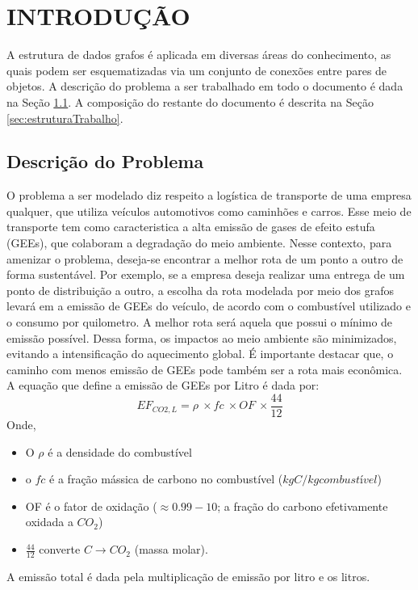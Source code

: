 \documentclass[
12pt,
a4paper,
semrecuonosumario,
sumario = abnt-6027-2012]{report}
\begin{document}
	\chapter{INTRODUÇÃO} \label{cap:introducao}

	A estrutura de dados grafos é aplicada em diversas áreas do conhecimento, as quais podem ser esquematizadas via um conjunto de conexões entre pares de objetos. A descrição do problema a ser trabalhado em todo o documento é dada na Seção \ref{sec:descGrafo}. A composição do restante do documento é descrita na Seção \ref{sec:estruturaTrabalho}.

	\section{Descrição do Problema}\label{sec:descGrafo}
	O problema a ser modelado diz respeito a logística de transporte de uma
	empresa qualquer, que utiliza veículos automotivos como caminhões e carros. Esse meio de transporte tem como caracteristica a alta emissão de gases de efeito estufa (GEEs), que colaboram a degradação do meio ambiente. Nesse
	contexto, para amenizar o problema, deseja-se encontrar a melhor rota de um
	ponto a outro de forma sustentável. Por exemplo, se a empresa deseja realizar
	uma entrega de um ponto de distribuição a outro, a escolha da rota modelada por
	meio dos grafos levará em a emissão de GEEs do veículo, de acordo com o combustível utilizado e o consumo por quilometro. A melhor rota
	será aquela que possui o mínimo de emissão possível. Dessa forma, os impactos ao meio ambiente são minimizados,
	evitando a intensificação do aquecimento global. É importante destacar que, o caminho com menos emissão de GEEs pode também ser a rota mais econômica. A equação que define a emissão de GEEs por Litro é dada por:
	$$ EF_{CO2,L}=\rho\ \times fc\ \times OF\ \times\frac{44}{12} $$
	Onde,
	\begin{itemize}
		\item O $\rho$ é  a densidade do combustível
		\item o $fc$ é a fração mássica de carbono no combustível ($kgC/kg combustível$)
		\item OF é o fator de oxidação ($\approx 0.99 - 10$; a fração do carbono efetivamente oxidada a $CO_2$)
		\item $\frac{44}{12}$  converte $C \rightarrow CO_2$ (massa molar).
	\end{itemize}
	A emissão total é dada pela multiplicação de emissão por litro e os litros.
\end{document}
